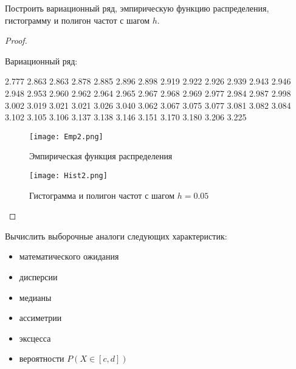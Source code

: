 \begin{problem}
	Построить вариационный ряд, эмпирическую функцию распределения, гистограмму и полигон частот с шагом $h$.
\end{problem}

\begin{proof}
	$ $
	
	Вариационный ряд:
	
	2.777 2.863 2.863 2.878 2.885 2.896 2.898 2.919 2.922 2.926 2.939 2.943 2.946 2.948 2.953
	2.960 2.962 2.964 2.965 2.967 2.968 2.969 2.977 2.984 2.987 2.998 3.002 3.019 3.021 3.021
	3.026 3.040 3.062 3.067 3.075 3.077 3.081 3.082 3.084 3.102 3.105 3.106 3.137 3.138 3.146
	3.151 3.170 3.180 3.206 3.225 
	\begin{figure}[h]
		\texttt{[image: Emp2.png]}
		\caption{Эмпирическая функция распределения}
	\end{figure}
	\begin{figure}[h]
		\texttt{[image: Hist2.png]}
		\caption{Гистограмма и полигон частот с шагом $h=0.05$}
	\end{figure}	
\end{proof}


\begin{problem}
	Вычислить выборочные аналоги следующих характеристик:
	\begin{itemize}
		\item математического ожидания
		\item дисперсии
		\item медианы
		\item ассиметрии
		\item эксцесса
		\item вероятности $P(X\in[c, d])$
	\end{itemize}
\end{problem}

